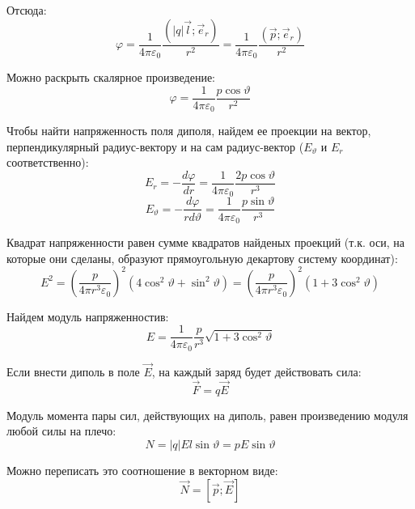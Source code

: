 \documentclass{article}
\begin{document}
	Отсюда:
	\begin{equation}
		\varphi = \frac{1}{4\pi\varepsilon_0}\frac{(|q|\vec l;\vec e_r)}{r^2} = \frac{1}{4\pi\varepsilon_0}\frac{(\vec p;\vec e_r)}{r^2}
	\end{equation}

	Можно раскрыть скалярное произведение:
	\begin{equation}
		\varphi = \frac{1}{4\pi\varepsilon_0}\frac{p\cos\vartheta}{r^2}
	\end{equation}

	Чтобы найти напряженность поля диполя, найдем ее проекции на вектор, перпендикулярный радиус-вектору и на сам радиус-вектор ($E_\vartheta$ и $E_r$ соответственно):
	\begin{equation}
		E_r = -\frac{d\varphi}{dr} = \frac{1}{4\pi\varepsilon_0}\frac{2p\cos\vartheta}{r^3}
	\end{equation}
	\begin{equation}
		E_\vartheta = -\frac{d\varphi}{rd\vartheta} = \frac{1}{4\pi\varepsilon_0}\frac{p\sin\vartheta}{r^3}
	\end{equation}

	Квадрат напряженности равен сумме квадратов найденых проекций (т.к. оси, на которые они сделаны, образуют прямоугольную декартову систему координат):
	\begin{equation}
		E^2 = (\frac{p}{4\pi r^3\varepsilon_0})^2(4\cos^2\vartheta+\sin^2\vartheta) = (\frac{p}{4\pi r^3\varepsilon_0})^2(1+3\cos^2\vartheta)
	\end{equation}

	Найдем модуль напряженностив:
	\begin{equation}
		E = \frac{1}{4\pi\varepsilon_0}\frac{p}{r^3}\sqrt{1+3\cos^2\vartheta} 
	\end{equation}

	Если внести диполь в поле $\vec E$, на каждый заряд будет действовать сила:
	\begin{equation}
		\vec F = q\vec E
	\end{equation}

	Модуль момента пары сил, действующих на диполь, равен произведению модуля любой силы на плечо:
	\begin{equation}
		N = |q|El\sin\vartheta = pE\sin\vartheta
	\end{equation}

	Можно переписать это соотношение в векторном виде:
	\begin{equation}
		\vec N = [\vec p;\vec E]
	\end{equation}
\end{document}
